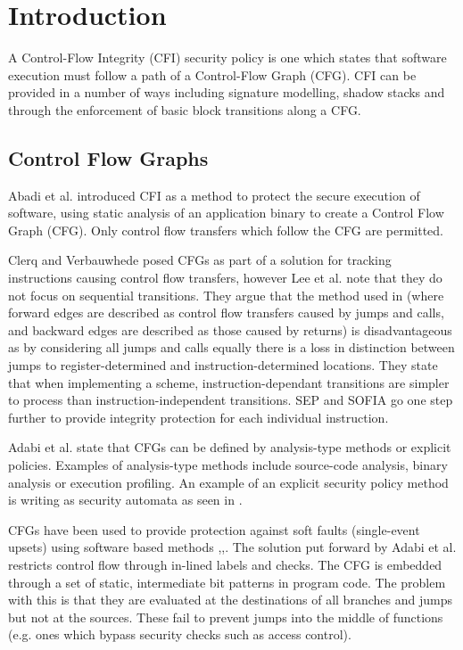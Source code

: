 \section{Introduction}
A Control-Flow Integrity (CFI) security policy is one which states that software execution must follow a path of a Control-Flow Graph (CFG). CFI can be provided in a number of ways including signature modelling, shadow stacks and through the enforcement of basic block transitions along a CFG.

\subsection{Control Flow Graphs}
Abadi et al. \cite{Abadi2005} introduced CFI as a method to protect the secure execution of software, using static analysis of an application binary to create a Control Flow Graph (CFG). Only control flow transfers which follow the CFG are permitted.

Clerq and Verbauwhede \cite{DeClercq2017} posed CFGs as part of a solution for tracking instructions causing control flow transfers, however Lee et al. \cite{Lee2019} note that they do not focus on sequential transitions. They argue that the method used in \cite{DeClercq2017} (where forward edges are described as control flow transfers caused by jumps and calls, and backward edges are described as those caused by returns) is disadvantageous as by considering all jumps and calls equally there is a loss in distinction between jumps to register-determined and instruction-determined locations. They state that when implementing a scheme, instruction-dependant transitions are simpler to process than instruction-independent transitions. SEP \cite{Lee2019} and SOFIA \cite{DeClercq2017b} go one step further to provide integrity protection for each individual instruction.

Adabi et al. \cite{Abadi2005} state that CFGs can be defined by analysis-type methods or explicit policies. Examples of analysis-type methods include source-code analysis, binary analysis or execution profiling. An example of an explicit security policy method is writing as security automata as seen in \cite{Erlingsson2004}. 
\ifnotesincluded
{}
\fi

CFGs have been used to provide protection against soft faults (single-event upsets) using software based methods \cite{Oh2002},\cite{Sharma2012},\cite{Venkatasubramanian2003}. 
The solution put forward by Adabi et al. \cite{Abadi2005} restricts control flow through in-lined labels and checks. The CFG is embedded through a set of static, intermediate bit patterns in program code. The problem with this is that they are evaluated at the destinations of all branches and jumps but not at the sources. These fail to prevent jumps into the middle of functions (e.g. ones which bypass security checks such as access control).

